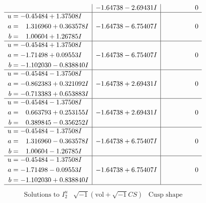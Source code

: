 \documentclass[1p]{elsarticle_modified}
\theoremstyle{definition}
\newcommand{\I}{\sqrt{-1}}
\begin{document}
$$\begin{array}{c|c|c}
 & -1.64738 - 2.69431 I & \phantom{-0.000000 } 0 \\ \hline\begin{aligned}
u &= -0.45484 + 1.37508 I \\
a &= \phantom{-}1.316960 + 0.363578 I \\
b &= \phantom{-}1.00604 + 1.26785 I\end{aligned}
 & -1.64738 - 6.75407 I & \phantom{-0.000000 } 0 \\ \hline\begin{aligned}
u &= -0.45484 + 1.37508 I \\
a &= -1.71498 + 0.09553 I \\
b &= -1.102030 - 0.838840 I\end{aligned}
 & -1.64738 - 6.75407 I & \phantom{-0.000000 } 0 \\ \hline\begin{aligned}
u &= -0.45484 - 1.37508 I \\
a &= -0.862383 + 0.321092 I \\
b &= -0.713383 + 0.653883 I\end{aligned}
 & -1.64738 + 2.69431 I & \phantom{-0.000000 } 0 \\ \hline\begin{aligned}
u &= -0.45484 - 1.37508 I \\
a &= \phantom{-}0.663793 + 0.253155 I \\
b &= \phantom{-}0.389845 - 0.356252 I\end{aligned}
 & -1.64738 + 2.69431 I & \phantom{-0.000000 } 0 \\ \hline\begin{aligned}
u &= -0.45484 - 1.37508 I \\
a &= \phantom{-}1.316960 - 0.363578 I \\
b &= \phantom{-}1.00604 - 1.26785 I\end{aligned}
 & -1.64738 + 6.75407 I & \phantom{-0.000000 } 0 \\ \hline\begin{aligned}
u &= -0.45484 - 1.37508 I \\
a &= -1.71498 - 0.09553 I \\
b &= -1.102030 + 0.838840 I\end{aligned}
 & -1.64738 + 6.75407 I & \phantom{-0.000000 } 0\\
 \hline 
 \end{array}$$\newpage$$\begin{array}{c|c|c}  
\text{Solutions to }I^u_{2}& \I (\text{vol} + \sqrt{-1}CS) & \text{Cusp shape}\\

\end{array}$$
\end{document}
